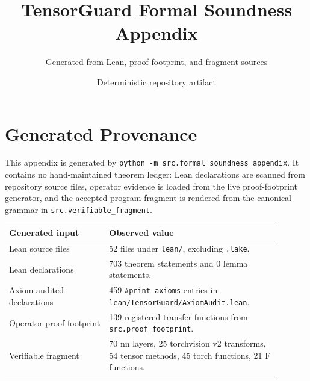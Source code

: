 \documentclass[10pt]{article}
\title{\textbf{TensorGuard Formal Soundness Appendix}}
\author{Generated from Lean, proof-footprint, and fragment sources}
\date{Deterministic repository artifact}
\begin{document}
\maketitle

\section{Generated Provenance}
This appendix is generated by \texttt{python -m src.formal\_soundness\_appendix}. It contains no hand-maintained theorem ledger: Lean declarations are scanned from repository source files, operator evidence is loaded from the live proof-footprint generator, and the accepted program fragment is rendered from the canonical grammar in \texttt{src.verifiable\_fragment}.

\begin{longtable}{|p{0.33\linewidth}|p{0.56\linewidth}|}
\hline
\textbf{Generated input} & \textbf{Observed value} \\
\hline
Lean source files & 52 files under \texttt{lean/}, excluding \texttt{.lake}. \\
\hline
Lean declarations & 703 theorem statements and 0 lemma statements. \\
\hline
Axiom-audited declarations & 459 \texttt{\#print axioms} entries in \texttt{lean/TensorGuard/AxiomAudit.lean}. \\
\hline
Operator proof footprint & 139 registered transfer functions from \texttt{src.proof\_footprint}. \\
\hline
Verifiable fragment & 70 nn layers, 25 torchvision v2 transforms, 54 tensor methods, 45 torch functions, 21 F functions. \\
\hline
\end{longtable}
\end{document}
